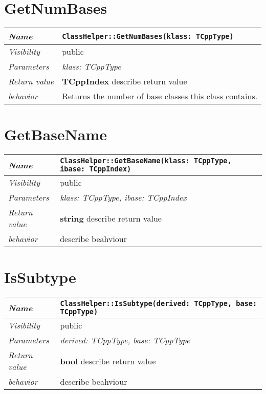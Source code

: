  \section{GetNumBases}
\begin{longtable}{p{3cm} @{\hskip 1cm} p{12cm}}
 \hline
\textit{Name} & \texttt{ClassHelper::GetNumBases(klass: TCppType)}\\
\hline
 \textit{Visibility} & public\\
\hline
\textit{Parameters} & \textit{klass: TCppType}\\
\hline
\textit{Return value} & \textbf{ TCppIndex} describe return value\\
  \hline
 \textit{behavior} & Returns the number of base classes this class contains. \\
\hline
\end{longtable} \pagebreak
 \section{GetBaseName}
\begin{longtable}{p{3cm} @{\hskip 1cm} p{12cm}}
 \hline
\textit{Name} & \texttt{ClassHelper::GetBaseName(klass: TCppType, ibase: TCppIndex)}\\
\hline
 \textit{Visibility} & public\\
\hline
\textit{Parameters} & \textit{klass: TCppType, ibase: TCppIndex}\\
\hline
\textit{Return value} & \textbf{ string} describe return value\\
  \hline
 \textit{behavior} & describe beahviour \\
\hline
\end{longtable} \pagebreak
 \section{IsSubtype}
\begin{longtable}{p{3cm} @{\hskip 1cm} p{12cm}}
 \hline
\textit{Name} & \texttt{ClassHelper::IsSubtype(derived: TCppType, base: TCppType)}\\
\hline
 \textit{Visibility} & public\\
\hline
\textit{Parameters} & \textit{derived: TCppType, base: TCppType}\\
\hline
\textit{Return value} & \textbf{ bool} describe return value\\
  \hline
 \textit{behavior} & describe beahviour \\
\hline
\end{longtable} \pagebreak
